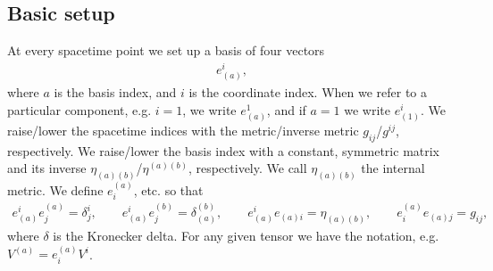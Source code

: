 \documentclass[12pt]{report}
\begin{document}
\subsection{Basic setup}
	 At every spacetime point we set up a basis of four vectors
\begin{align}
	e^i_{(a)}
	,
\end{align}
	where $a$ is the basis index, and $i$ is the coordinate index.
When we refer to a particular component, e.g. $i=1$, we write 
$e^1_{(a)}$, and if $a=1$ we write $e^i_{(1)}$.
We raise/lower the spacetime indices with the metric/inverse
metric
$g_{ij}$/$g^{ij}$, respectively. 
We raise/lower the basis index with a constant, symmetric
matrix and its inverse $\eta_{(a)(b)}$/$\eta^{(a)(b)}$, respectively.
We call $\eta_{(a)(b)}$ the internal metric. We define $e^{(a)}_i$, etc.
so that 
\begin{align}
	e^i_{(a)} e^{(a)}_j = \delta^i_j
	,
	\qquad
	e^i_{(a)} e^{(b)}_j = \delta^{(b)}_{(a)}
	,
	\qquad
	e^i_{(a)} e_{(a)i} = \eta_{(a)(b)}
	,
	\qquad
	e^{(a)}_ie_{(a)j} = g_{ij}
	,
\end{align}
	where $\delta$ is the Kronecker delta. For any given tensor
we have the notation, e.g. $V^{(a)}=e^{(a)}_iV^i$. 
\end{document}
